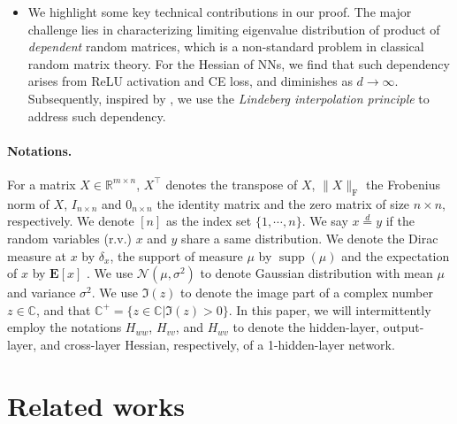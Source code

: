\documentclass{article}
\newcommand{\E}{\mathbf{E}}
\newcommand{\mb}{\mathbb}
\newcommand{\1}{^{(1)}}
\newcommand{\2}{^{(2)}}
\begin{document}
\begin{itemize}
    
    
   \item We highlight some key technical contributions in our proof. The major challenge lies in characterizing limiting eigenvalue distribution of product of {\it dependent} random matrices, which is a non-standard problem in classical random matrix theory. 
   For the Hessian of NNs, we find that such dependency arises from ReLU activation and CE loss, and diminishes as $d \rightarrow \infty$. Subsequently, inspired by \citet{pastur2020random}, we use the {\it Lindeberg interpolation principle} to address such dependency.

  
\end{itemize}


\paragraph{Notations.}  For a  matrix $X \in \mathbb{R}^{m\times n}$, $X^\top$ denotes the transpose of $X$, $\|X\|_{\operatorname{F}}$ the Frobenius norm of $X$, $I_{n\times n}$ and $0_{n \times n}$ the identity matrix and the zero matrix of size $n \times n$, respectively. We denote $[n]$ as the index set $\{1,\cdots, n\}$. We say $ x\overset{d}{=} y$ if the random variables (r.v.) $x$ and $y$ share a same distribution. We denote the Dirac measure at $x$ by $\delta_x$, the support of measure $\mu$ by $\operatorname{supp}(\mu)$  and the expectation of $x$  by $\E[x]$ .
 We use $\mathcal{N}(\mu, \sigma^2)$ to denote Gaussian distribution with mean $\mu$ and variance $\sigma^2$. 
 We use $\Im(z)$ to denote the image part of a complex number $z \in \mb{C}$, and that $\mb{C}^+ = \{z \in \mb{C}| \Im(z) >0\}$.  In this paper, we will intermittently employ the notations $H_{ww}$, $H_{vv}$, and $H_{wv}$ to denote the hidden-layer, output-layer, and cross-layer Hessian, respectively, of a 1-hidden-layer network.



\section{Related works}
\label{appendix_related_works}
\end{document}

